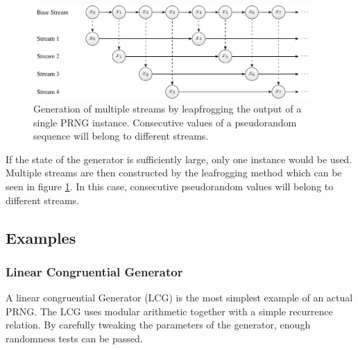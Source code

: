 \documentclass{stdlocal}
\begin{document}
  \begin{figure}
    \center
    \includegraphics[width=0.95\textwidth]{figures/leapfrogging_multiple_streams.pdf}
    \caption[Leapfrogging Generation of Multiple Streams]{
      Generation of multiple streams by leapfrogging the output of a single PRNG instance.
      Consecutive values of a pseudorandom sequence will belong to different streams.
    }
    \label{fig:leapfrogging-multiple-streams}
  \end{figure}

  If the state of the generator is sufficiently large, only one instance would be used.
  Multiple streams are then constructed by the leafrogging method which can be seen in figure \ref{fig:leapfrogging-multiple-streams}.
  In this case, consecutive pseudorandom values will belong to different streams.
  \autocite{fog2015,lecuyer2017}






  \subsection{Examples}
  \subsubsection*{Linear Congruential Generator} %
    A linear congruential Generator (LCG) is the most simplest example of an actual PRNG.
    The LCG uses modular arithmetic together with a simple recurrence relation.
    By carefully tweaking the parameters of the generator, enough randomness tests can be passed.
    \autocite{kneusel2018}
\end{document}
